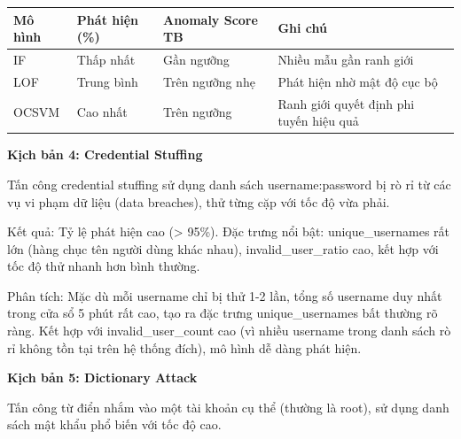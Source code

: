 \documentclass[
  a4paper]{report}
\newcounter{none} %
\begin{document}
{\def\LTcaptype{none} %
\begin{longtable}[]{@{}
  >{\raggedright\arraybackslash}p{}
  >{\raggedright\arraybackslash}p{}
  >{\raggedright\arraybackslash}p{}
  >{\raggedright\arraybackslash}p{}@{}}
\toprule\noalign{}
\begin{minipage}[b]{\linewidth}\raggedright
Mô hình
\end{minipage} & \begin{minipage}[b]{\linewidth}\raggedright
Phát hiện (\%)
\end{minipage} & \begin{minipage}[b]{\linewidth}\raggedright
Anomaly Score TB
\end{minipage} & \begin{minipage}[b]{\linewidth}\raggedright
Ghi chú
\end{minipage} \\
\midrule\noalign{}
\endhead
\bottomrule\noalign{}
\endlastfoot
IF & Thấp nhất & Gần ngưỡng & Nhiều mẫu gần ranh giới \\
LOF & Trung bình & Trên ngưỡng nhẹ & Phát hiện nhờ mật độ cục bộ \\
OCSVM & Cao nhất & Trên ngưỡng & Ranh giới quyết định phi tuyến hiệu
quả \\
\end{longtable}
}

\textbf{Kịch bản 4: Credential Stuffing}

Tấn công credential stuffing sử dụng danh sách username:password bị rò
rỉ từ các vụ vi phạm dữ liệu (data breaches), thử từng cặp với tốc độ
vừa phải.

Kết quả: Tỷ lệ phát hiện cao (\textgreater{} 95\%). Đặc trưng nổi bật:
unique\_usernames rất lớn (hàng chục tên người dùng khác nhau),
invalid\_user\_ratio cao, kết hợp với tốc độ thử nhanh hơn bình thường.

Phân tích: Mặc dù mỗi username chỉ bị thử 1-2 lần, tổng số username duy
nhất trong cửa sổ 5 phút rất cao, tạo ra đặc trưng unique\_usernames bất
thường rõ ràng. Kết hợp với invalid\_user\_count cao (vì nhiều username
trong danh sách rò rỉ không tồn tại trên hệ thống đích), mô hình dễ dàng
phát hiện.

\textbf{Kịch bản 5: Dictionary Attack}

Tấn công từ điển nhắm vào một tài khoản cụ thể (thường là root), sử dụng
danh sách mật khẩu phổ biến với tốc độ cao.
\end{document}
